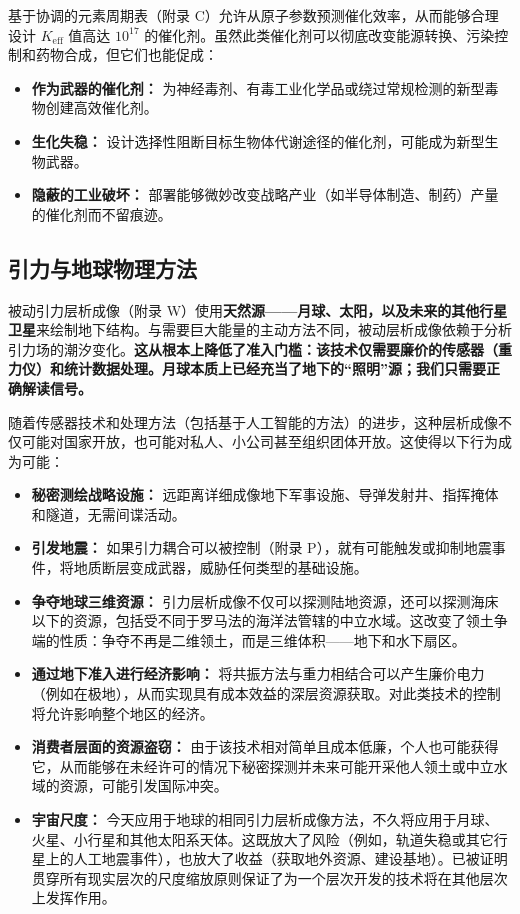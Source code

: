 \documentclass[12pt,a4paper]{article}
\theoremstyle{remark}
\newcommand{\Keff}{K_{\mathrm{eff}}}
\begin{document}
	基于协调的元素周期表（附录 C）允许从原子参数预测催化效率，从而能够合理设计 \(\Keff\) 值高达 \(10^{17}\) 的催化剂。虽然此类催化剂可以彻底改变能源转换、污染控制和药物合成，但它们也能促成：
	\begin{itemize}[leftmargin=*]
		\item \textbf{作为武器的催化剂：} 为神经毒剂、有毒工业化学品或绕过常规检测的新型毒物创建高效催化剂。
		\item \textbf{生化失稳：} 设计选择性阻断目标生物体代谢途径的催化剂，可能成为新型生物武器。
		\item \textbf{隐蔽的工业破坏：} 部署能够微妙改变战略产业（如半导体制造、制药）产量的催化剂而不留痕迹。
	\end{itemize}
	
	\subsection{引力与地球物理方法}
	\label{subsec:gravity}
	
	被动引力层析成像（附录 W）使用\textbf{天然源——月球、太阳，以及未来的其他行星卫星}来绘制地下结构。与需要巨大能量的主动方法不同，被动层析成像依赖于分析引力场的潮汐变化。\textbf{这从根本上降低了准入门槛：该技术仅需要廉价的传感器（重力仪）和统计数据处理。月球本质上已经充当了地下的“照明”源；我们只需要正确解读信号。}
	
	随着传感器技术和处理方法（包括基于人工智能的方法）的进步，这种层析成像不仅可能对国家开放，也可能对私人、小公司甚至组织团体开放。这使得以下行为成为可能：
	\begin{itemize}[leftmargin=*]
		\item \textbf{秘密测绘战略设施：} 远距离详细成像地下军事设施、导弹发射井、指挥掩体和隧道，无需间谍活动。
		\item \textbf{引发地震：} 如果引力耦合可以被控制（附录 P），就有可能触发或抑制地震事件，将地质断层变成武器，威胁任何类型的基础设施。
		\item \textbf{争夺地球三维资源：} 引力层析成像不仅可以探测陆地资源，还可以探测海床以下的资源，包括受不同于罗马法的海洋法管辖的中立水域。这改变了领土争端的性质：争夺不再是二维领土，而是三维体积——地下和水下扇区。
		\item \textbf{通过地下准入进行经济影响：} 将共振方法与重力相结合可以产生廉价电力（例如在极地），从而实现具有成本效益的深层资源获取。对此类技术的控制将允许影响整个地区的经济。
		\item \textbf{消费者层面的资源盗窃：} 由于该技术相对简单且成本低廉，个人也可能获得它，从而能够在未经许可的情况下秘密探测并未来可能开采他人领土或中立水域的资源，可能引发国际冲突。
		\item \textbf{宇宙尺度：} 今天应用于地球的相同引力层析成像方法，不久将应用于月球、火星、小行星和其他太阳系天体。这既放大了风险（例如，轨道失稳或其它行星上的人工地震事件），也放大了收益（获取地外资源、建设基地）。已被证明贯穿所有现实层次的尺度缩放原则保证了为一个层次开发的技术将在其他层次上发挥作用。
	\end{itemize}
	
\end{document}
